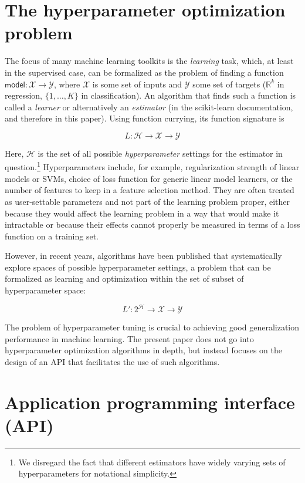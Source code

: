 \documentclass[a4paper,twocolumn]{article}
\begin{document}
\section{The hyperparameter optimization problem}
\label{hyperparams}

The focus of many machine learning toolkits is the \textit{learning} task,
which, at least in the supervised case,
can be formalized as the problem of finding a function
$\mathsf{model} : \mathcal{X} \to \mathcal{Y}$,
where $\mathcal{X}$ is some set of inputs
and $\mathcal{Y}$ some set of targets
($\mathbb{R}^k$ in regression, $\{1,\dots,K\}$ in classification).
An algorithm that finds such a function is called a \textit{learner}
or alternatively an \textit{estimator}
(in the scikit-learn documentation, and therefore in this paper).
Using function currying, its function signature is

\[
  L : \mathcal{H} \to \mathcal{X} \to \mathcal{Y}
\]

Here, $\mathcal{H}$ is the set of all possible \textit{hyperparameter} settings
for the estimator in question.\footnote{
  We disregard the fact that different estimators
  have widely varying sets of hyperparameters for notational simplicity.}
Hyperparameters include, for example,
regularization strength of linear models or SVMs,
choice of loss function for generic linear model learners,
or the number of features to keep in a feature selection method.
They are often treated as user-settable parameters
and not part of the learning problem proper,
either because they would affect the learning problem
in a way that would make it intractable \citep{bergstra2012}
or because their effects cannot properly be measured
in terms of a loss function on a training set.

However, in recent years, algorithms have been published
that systematically explore spaces of possible hyperparameter settings,
a problem that can be formalized as learning and optimization
within the set of subset of hyperparameter space:

\[
  L' : 2^\mathcal{H} \to \mathcal{X} \to \mathcal{Y}
\]

The problem of hyperparameter tuning
is crucial to achieving good generalization performance in machine learning.
The present paper does not go into hyperparameter optimization algorithms
in depth, but instead focuses on the design of an API
that facilitates the use of such algorithms.

\section{Application programming interface (API)}
\end{document}
